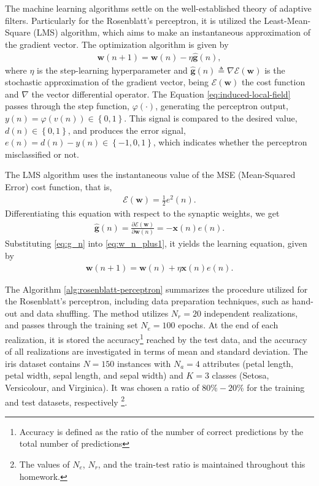 \documentclass[12pt,a4paper]{article}
\begin{document}
The machine learning algorithms settle on the well-established theory of adaptive filters. Particularly for the Rosenblatt's perceptron, it is utilized the Least-Mean-Square (LMS) algorithm, which aims to make an instantaneous approximation of the gradient vector. The optimization algorithm is given by
\begin{align}
    \mathbf{w}(n+1) = \mathbf{w}(n) - \eta \hat{\mathbf{g}}(n),
    \label{eq:w_n_plus1}
\end{align}
where \(\eta\) is the step-learning hyperparameter and \(\hat{\mathbf{g}}(n) \triangleq \nabla \mathscr{E} (\mathbf{w})\) is the stochastic approximation of the gradient vector, being \(\mathscr{E} (\mathbf{w})\) the cost function and \(\nabla\) the vector differential operator. The Equation \eqref{eq:induced-local-field} passes through the step function, \(\varphi \left( \cdot \right)\), generating the perceptron output, \(y\left( n \right) = \varphi(v\left( n \right)) \in \left\{ 0,1 \right\}\). This signal is compared to the desired value, \(d\left( n \right) \in \left\{ 0,1 \right\} \), and produces the error signal, \(e\left( n \right) = d\left( n \right) - y\left( n \right) \in \left\{ -1, 0, 1 \right\}\), which indicates whether the perceptron misclassified or not.

The LMS algorithm uses the instantaneous value of the MSE (Mean-Squared Error) cost function, that is,
\begin{align}
    \mathscr{E} (\mathbf{w}) = \frac{1}{2}e^2(n).
\end{align}
Differentiating this equation with respect to the synaptic weights, we get
\begin{align}
    \hat{\mathbf{g}}(n) = \frac{\partial\mathscr{E} (\mathbf{w})}{\partial \mathbf{w}(n)} = - \mathbf{x}(n) e(n).
    \label{eq:g_n}
\end{align}
Substituting \eqref{eq:g_n} into \eqref{eq:w_n_plus1}, it yields the learning equation, given by
\begin{align}
    \mathbf{w}(n+1) = \mathbf{w}(n) + \eta \mathbf{x}(n) e(n).
\end{align}

The Algorithm \ref{alg:rosenblatt-perceptron} summarizes the procedure utilized for the Rosenblatt's perceptron, including data preparation techniques, such as hand-out and data shuffling. The method utilizes \(N_r=20\) independent realizations, and passes through the training set \(N_e=100\) epochs. At the end of each realization, it is stored the accuracy\footnote{Accuracy is defined as the ratio of the number of correct predictions by the total number of predictions} reached by the test data, and the accuracy of all realizations are investigated in terms of mean and standard deviation. The iris dataset contains \(N=150\) instances with \(N_a=4\) attributes (petal length, petal width, sepal length, and sepal width) and \(K=3\) classes (Setosa, Versicolour, and Virginica). It was chosen a ratio of \(80\%-20\%\) for the training and test datasets, respectively \footnote{The values of \(N_e\), \(N_r\), and the train-test ratio is maintained throughout this homework.}.
\end{document}
